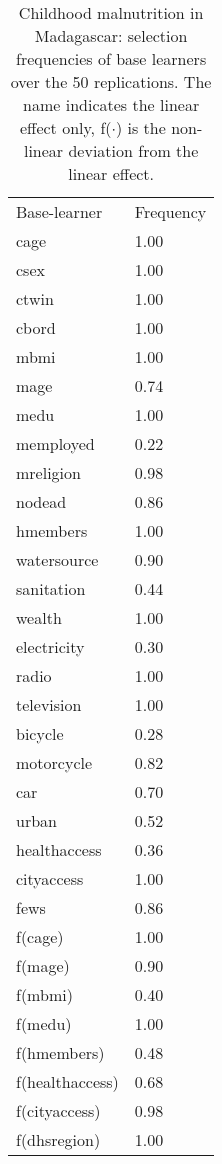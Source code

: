 \begin{table}[!p]
	\centering
	
	\begin{tabularx}{0.8\textwidth}{Xl}
		
		Base-learner & Frequency \\ \arrayrulecolor{black!30}\midrule
		cage & 1.00 \\ 
		csex & 1.00 \\ 
		ctwin & 1.00 \\ 
		cbord & 1.00 \\ 
		mbmi & 1.00 \\ 
		mage & 0.74 \\ 
		medu & 1.00 \\ 
		memployed & 0.22 \\ 
		mreligion & 0.98 \\ 
		nodead & 0.86 \\ 
		hmembers & 1.00 \\ 
		watersource & 0.90 \\ 
		sanitation & 0.44 \\ 
		wealth & 1.00 \\ 
		electricity & 0.30 \\ 
		radio & 1.00 \\ 
		television & 1.00 \\ 
		bicycle & 0.28 \\ 
		motorcycle & 0.82 \\ 
		car & 0.70 \\ 
		urban & 0.52 \\ 
		healthaccess & 0.36 \\ 
		cityaccess & 1.00 \\ 
		fews & 0.86 \\ 
		f(cage) & 1.00 \\ 
		f(mage) & 0.90 \\ 
		f(mbmi) & 0.40 \\ 
		f(medu) & 1.00 \\ 
		f(hmembers) & 0.48 \\ 
		f(healthaccess) & 0.68 \\ 
		f(cityaccess) & 0.98 \\ 
		f(dhsregion) & 1.00 \\ 
	\end{tabularx}

	\caption{Childhood malnutrition in Madagascar: selection frequencies of base learners over the 50 replications. The name indicates the linear effect only, f($\cdot$) is the non-linear deviation from the linear effect.}
	\label{tab:madagascar_selectionfreq}

\end{table}
